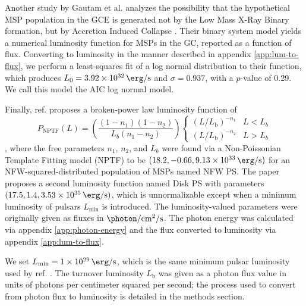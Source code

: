\documentclass[a4paper,11pt]{article}
\newcommand{\parens}[1]{\left(#1\right)}
\newcommand{\fraci}[2]{#1 / #2}
\newcommand{\comment}[1]{\emph{\color{red}{#1}}}
\begin{document}
Another study by Gautam et al. analyzes the possibility that the hypothetical MSP population in the GCE is generated not by the Low Mass X-Ray Binary formation, but by Accretion Induced Collapse \cite{Gautam:2021wqn}. \comment{To distinguish between this, a definition of these two collapse methods, along with models other than an MSP model, should be put in the introduction. Mention the fact that the MSPs in the GCE would have to look different from that in the disk.} Their binary system model yields a numerical luminosity function for MSPs in the GC, reported as a function of flux. Converting to luminosity in the manner described in appendix \ref{app:lum-to-flux}, we perform a least-squares fit of a log normal distribution to their function, which produces $L_0 = \SI{3.92e+32}{\erg\per\second}$ and $\sigma = 0.937$, with a $p$-value of 0.29. We call this model the AIC log normal model.

Finally, ref. \cite{Lee:2015fea} proposes a broken-power law luminosity function of
\begin{equation}
    P_\text{NPTF}(L) = \parens{\frac{\parens{1-n_1}\parens{1-n_2}}{L_b \parens{n_1 - n_2}}}\begin{cases}
        \parens{\fraci{L}{L_\text{b}}}^{-n_{1}} & L < L_{b} \\
        \parens{\fraci{L}{L_\text{b}}}^{-n_{2}} & L > L_b
    \end{cases}
    \label{eqn:nptf}
\end{equation},
where the free parameters  $n_1$, $n_2$, and $L_b$ were found via a Non-Poissonian Template Fitting model (NPTF) to be $(18.2, -0.66, \SI{9.13e+33}{\erg\per\second})$ for an NFW-squared-distributed population of MSPs named NFW PS. The paper proposes a second luminosity function named Disk PS with parameters $(17.5, 1.4, \SI{3.53e+35}{\erg\per\second})$, which is unnormalizable except when a minimum luminosity of pulsars $L_\text{min}$ is introduced. The luminosity-valued parameters were originally given as fluxes in $\SI{}{\photon \per \centi\meter\squared \per \second}$. The photon energy was calculated via appendix \ref{app:photon-energy} and the flux converted to luminosity via appendix \ref{app:lum-to-flux}.

We set $L_\text{min}=\SI{1e29}{\erg\per\second}$, which is the same minimum pulsar luminosity used by ref. \cite{Zhong:2019ycb}. The turnover luminosity $L_\text{b}$ was given as a photon flux value in units of photons per centimeter squared per second; the process used to convert from photon flux to luminosity is detailed in the methods section.
\end{document}
